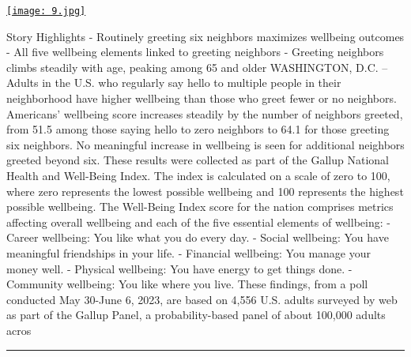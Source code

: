 \documentclass[10pt,a4paper]{article}
\begin{document}
\begin{minipage}[t]{0.80\linewidth}
\vspace{0pt}
\begin{multicols}{2}

    \href{https://news.gallup.com/poll/509543/saying-hello-linked-higher-wellbeing-limits.aspx?utm\_source=hackernewsletter\&utm\_medium=email\&utm\_term=fav}{
        \texttt{[image: 9.jpg]}
    }
  
Story Highlights
- Routinely greeting six neighbors maximizes wellbeing outcomes
- All five wellbeing elements linked to greeting neighbors
- Greeting neighbors climbs steadily with age, peaking among 65 and older
WASHINGTON, D.C. -- Adults in the U.S. who regularly say hello to multiple people in their neighborhood have higher wellbeing than those who greet fewer or no neighbors. Americans’ wellbeing score increases steadily by the number of neighbors greeted, from 51.5 among those saying hello to zero neighbors to 64.1 for those greeting six neighbors. No meaningful increase in wellbeing is seen for additional neighbors greeted beyond six.
These results were collected as part of the Gallup National Health and Well-Being Index. The index is calculated on a scale of zero to 100, where zero represents the lowest possible wellbeing and 100 represents the highest possible wellbeing. The Well-Being Index score for the nation comprises metrics affecting overall wellbeing and each of the five essential elements of wellbeing:
- Career wellbeing: You like what you do every day.
- Social wellbeing: You have meaningful friendships in your life.
- Financial wellbeing: You manage your money well.
- Physical wellbeing: You have energy to get things done.
- Community wellbeing: You like where you live.
These findings, from a poll conducted May 30-June 6, 2023, are based on 4,556 U.S. adults surveyed by web as part of the Gallup Panel, a probability-based panel of about 100,000 adults acros

\end{multicols}
\end{minipage}
\par\medskip
\noindent\textcolor{red}{\rule{\linewidth}{0.2mm}}
\end{document}
